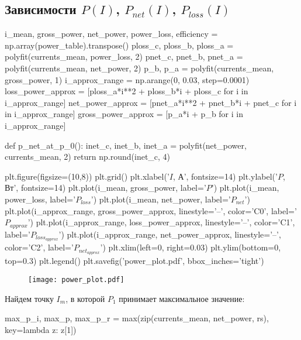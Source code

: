 \documentclass[12pt, a4paper]{article}
\begin{document}
\begin{table}[H]
\end{table} 

\subsection*{Зависимости $P(I)$, $P_{net}(I)$, $P_{loss}(I)$}

\begin{pycode}
i_mean, gross_power, net_power, power_loss, efficiency = np.array(power_table).transpose()
ploss_c, ploss_b, ploss_a = polyfit(currents_mean, power_loss, 2)
pnet_c, pnet_b, pnet_a = polyfit(currents_mean, net_power, 2)
p_b, p_a = polyfit(currents_mean, gross_power, 1)
i_approx_range = np.arange(0, 0.03, step=0.0001)
loss_power_approx = [ploss_a*i**2 + ploss_b*i + ploss_c for i in i_approx_range]
net_power_approx = [pnet_a*i**2 + pnet_b*i + pnet_c for i in i_approx_range]
gross_power_approx = [p_a*i + p_b for i in i_approx_range]

def p_net_at_p_0():
  inet_c, inet_b, inet_a = polyfit(net_power, currents_mean, 2)
  return np.round(inet_c, 4)

plt.figure(figsize=(10,8))
plt.grid()
plt.xlabel('$I$, А', fontsize=14)
plt.ylabel('$P$, Вт', fontsize=14)
plt.plot(i_mean, gross_power, label='$P$')
plt.plot(i_mean, power_loss, label='$P_{loss}$')
plt.plot(i_mean, net_power, label='$P_{net}$')
plt.plot(i_approx_range, gross_power_approx, linestyle='--', color='C0', label='$P_{approx}$')
plt.plot(i_approx_range, loss_power_approx, linestyle='--', color='C1', label='$P_{loss_{approx}}$')
plt.plot(i_approx_range, net_power_approx, linestyle='--', color='C2', label='$P_{net_{approx}}$')
plt.xlim(left=0, right=0.03)
plt.ylim(bottom=0, top=0.3)
plt.legend()
plt.savefig('power_plot.pdf', bbox_inches='tight')
\end{pycode}

\begin{figure}[H]
\texttt{[image: power\_plot.pdf]}
\end{figure}
\newpage

Найдем точку $I_m$, в которой $P_1$ принимает максимальное значение:

\begin{pycode}
max_p_i, max_p, max_p_r = max(zip(currents_mean, net_power, rs),
key=lambda z: z[1])
\end{pycode}
\end{document}
